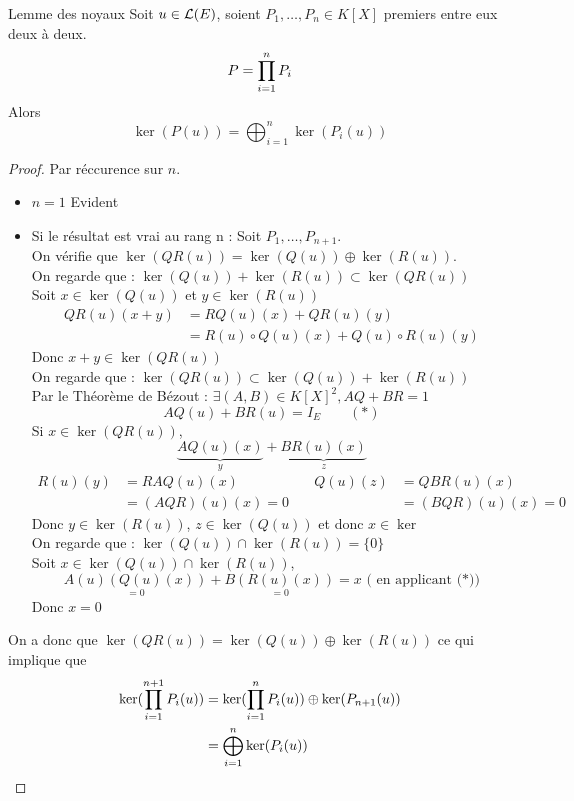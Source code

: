 \documentclass[]{report}
\begin{document}
    \begin{lm}{Lemme des noyaux}{}
        Soit $u\in\mathcal{L}(E)$, soient $P_1,\ldots,P_n\in K[X]$ premiers entre eux deux à deux.
        \[P=\prod_{i=1}^{n}P_i\]
        Alors
        \[\ker(P(u))=\bigoplus_{i=1}^n\ker(P_i(u))\]
    \end{lm}

    \begin{proof}
        Par réccurence sur $n$.
        \begin{itemize}
            \item $n=1$ Evident
            \item Si le résultat est vrai au rang n : Soit $P_1,\ldots,P_{n+1}$.\\
            On vérifie que $\ker(QR(u))=\ker(Q(u))\oplus \ker (R(u))$. \\
            On regarde que : $\ker(Q(u)) + \ker (R(u))\subset\ker(QR(u))$\\
            Soit $x\in\ker (Q(u))$ et $y\in\ker (R(u))$
            \begin{align*} QR(u)(x+y)&=RQ(u)(x)+QR(u)(y)\\
            &= R(u)\circ Q(u)(x)+Q(u)\circ R(u)(y)\end{align*}
            Donc $x+y\in \ker (QR(u))$\\
            On regarde que : $\ker(QR(u))\subset\ker(Q(u)) + \ker (R(u))$\\
            Par le Théorème de Bézout : $\exists (A,B)\in K[X]^2,AQ+BR=1$
            \[AQ(u)+BR(u)=I_E\qquad (*)\]
            Si $x\in\ker (QR(u))$,
            \[\underset{y}{\underbrace{AQ(u)(x)}}+\underset{z}{\underbrace{BR(u)(x)}}\]
            \begin{align*}
                R(u)(y)&=RAQ(u)(x)\quad&\quad Q(u)(z)&=QBR(u)(x)\\
                &=(AQR)(u)(x)=0&&=(BQR)(u)(x)=0
            \end{align*}
            Donc $y\in\ker (R(u))$, $z\in\ker (Q(u))$ et donc $x\in\ker$\\
            On regarde que : $\ker (Q(u))\cap\ker (R(u))=\{0\}$\\
            Soit $x\in \ker (Q(u))\cap\ker(R(u))$,
            \[\underset{=0}{A(u)(Q(u)(x))}+\underset{=0}{B(R(u)(x))}=x \text{ ( en applicant (*))}\]
            Donc $x=0$
        \end{itemize}
        On a donc que $\ker (QR(u))=\ker(Q(u))\oplus\ker (R(u))$ ce qui implique que
        \begin{align*}
            \ker (\prod_{i=1}^{n+1}P_i(u))&=\ker(\prod_{i=1}^{n}P_i(u))\oplus\ker(P_{n+1}(u))\\
            &=\bigoplus_{i=1}^n\ker(P_i(u))
        \end{align*}
    \end{proof}
\end{document}
